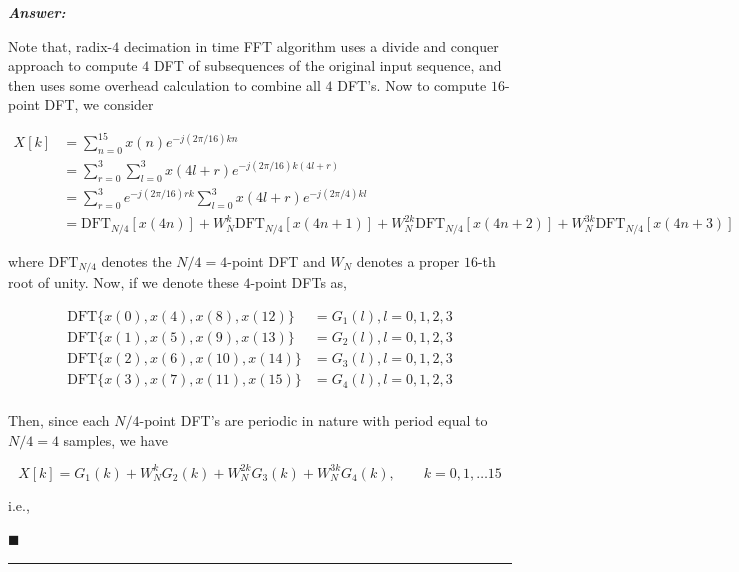 \documentclass[12pt]{article}
\theoremstyle{definition}
\newenvironment{answer}{
    \textbf{\textit{Answer:}} \qquad
}{\hfill $\blacksquare$ \\ \begin{center}
    \rule{0.6\linewidth}{0.5px}    
\end{center}
}
\begin{document}
\begin{answer}
    Note that, radix-$4$ decimation in time FFT algorithm uses a divide and conquer approach to compute $4$ DFT of subsequences of the original input sequence, and then uses some overhead calculation to combine all $4$ DFT's. Now to compute $16$-point DFT, we consider

    \begin{align*}
        X[k]
        & = \sum_{n = 0}^{15} x(n) e^{-j(2\pi/16)kn}\\
        & = \sum_{r = 0}^{3} \sum_{l = 0}^{3} x(4l + r) e^{-j(2\pi/16)k(4l + r)}\\
        & = \sum_{r = 0}^{3} e^{-j(2\pi/16)rk} \sum_{l = 0}^{3} x(4l + r) e^{-j(2\pi/4)kl}\\
        & = \text{DFT}_{N/4}[x(4n)] + W_N^k \text{DFT}_{N/4}[x(4n+1)] + W_N^{2k}\text{DFT}_{N/4}[x(4n+2)] + W_N^{3k}\text{DFT}_{N/4}[x(4n+3)]
    \end{align*}

    where $\text{DFT}_{N/4}$ denotes the $N/4 = 4$-point DFT and $W_N$ denotes a proper $16$-th root of unity. Now, if we denote these $4$-point DFTs as,

    \begin{align*}
        \text{DFT}\{ x(0), x(4), x(8), x(12) \} & = G_1(l), l = 0, 1, 2, 3\\
        \text{DFT}\{ x(1), x(5), x(9), x(13) \} & = G_2(l), l = 0, 1, 2, 3\\
        \text{DFT}\{ x(2), x(6), x(10), x(14) \} & = G_3(l), l = 0, 1, 2, 3\\
        \text{DFT}\{ x(3), x(7), x(11), x(15) \} & = G_4(l), l = 0, 1, 2, 3\\
    \end{align*}

    Then, since each $N/4$-point DFT's are periodic in nature with period equal to $N / 4 = 4$ samples, we have

    $$
    X[k] = G_1(k) + W_N^{k} G_2(k) + W_N^{2k} G_3(k) + W_N^{3k} G_4(k), \qquad k = 0, 1, \dots 15
    $$

    i.e.,


\end{answer}
\end{document}
